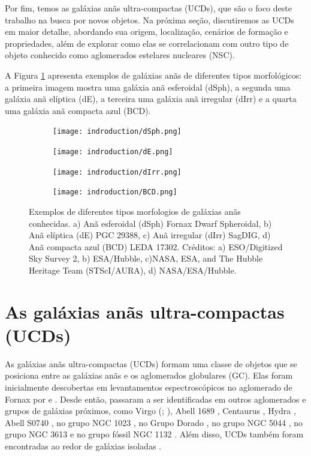 Por fim, temos as galáxias anãs ultra-compactas (UCDs), que são o foco deste trabalho na busca por novos objetos. Na próxima seção, discutiremos as UCDs em maior detalhe, abordando sua origem, localização, cenários de formação e propriedades, além de explorar como elas se correlacionam com outro tipo de objeto conhecido como aglomerados estelares nucleares (NSC).

A Figura \ref{dwarf_galaxies} apresenta exemplos de galáxias anãs de diferentes tipos morfológicos: a primeira imagem mostra uma galáxia anã esferoidal (\ac{dSph}), a segunda uma galáxia anã elíptica (\ac{dE}), a terceira uma galáxia anã irregular (\ac{dIrr}) e a quarta uma galáxia anã compacta azul (\ac{BCD}).

\begin{figure}[!ht]
    \centering
    \captionsetup{justification=centering}
    \begin{subfigure}[b]{0.33\textwidth}
        \texttt{[image: indroduction/dSph.png]}
        \caption{}
    \end{subfigure}
    \begin{subfigure}[b]{0.33\textwidth}
        \texttt{[image: indroduction/dE.png]}
        \caption{}
    \end{subfigure}
    \begin{subfigure}[b]{0.33\textwidth}
        \texttt{[image: indroduction/dIrr.png]}
        \caption{}
    \end{subfigure}
    \begin{subfigure}[b]{0.33\textwidth}
        \texttt{[image: indroduction/BCD.png]}
        \caption{}
    \end{subfigure}
    \caption{Exemplos de diferentes tipos morfologios de galáxias anãs conhecidas. a) Anã esferoidal (dSph) Fornax Dwarf Spheroidal, b) Anã elíptica (dE) PGC 29388, c) Anã irregular (dIrr) SagDIG, d) Anã compacta azul (BCD) LEDA 17302. Créditos: a) ESO/Digitized Sky Survey 2, b) ESA/Hubble, c)NASA, ESA, and The Hubble Heritage Team (STScI/AURA), d) NASA/ESA/Hubble.}
    \label{dwarf_galaxies}
\end{figure}

\section{As galáxias anãs ultra-compactas (UCDs)}\label{sec:UCDs}
As galáxias anãs ultra-compactas (UCDs) formam uma classe de objetos que se posiciona entre as galáxias anãs e os aglomerados globulares (\ac{GC}). Elas foram inicialmente descobertas em levantamentos espectroscópicos no aglomerado de Fornax por \cite{Drinkwater_2000} e \cite{Hilker_1999}. Desde então, passaram a ser identificadas em outros aglomerados e grupos de galáxias próximos, como Virgo (\citealp{Hasegan_2005}; \citealp{Liu_2020}), Abell 1689 \citep{Mieske_2005}, Centaurus \citep{Mieske_2007}, Hydra \citep{Wehner_Harris_2007}, Abell S0740 \citep{Blakeslee_DeGraaff2008}, no grupo NGC 1023 \citep{Mieske_West_Oliveira_2007}, no Grupo Dorado \citep{Evstigneeva_2007}, no grupo NGC 5044 \citep{Faifer_2017}, no grupo NGC 3613 \citep{Bortoli_2020} e no grupo fóssil NGC 1132 \citep{Madrid_2011}. Além disso, UCDs também foram encontradas ao redor de galáxias isoladas \citep{Hau_2009}.

